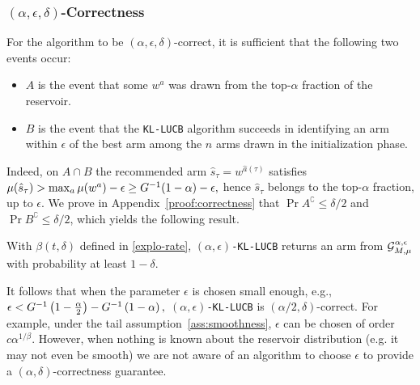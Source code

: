 %
%
\subsubsection{$(\alpha,\epsilon,\delta)$-Correctness}\label{sec-correctness}

For the algorithm to be $(\alpha,\epsilon,\delta)$-correct, it is sufficient that the following two events occur: 
\begin{itemize}[nosep]
    \item $A$ is the event that some $w^a$ was drawn from the
         top-$\alpha$ fraction of the reservoir.
    \item $B$ is the event that the \texttt{KL-LUCB} algorithm succeeds in 
identifying an arm within $\epsilon$ of the best arm among the $n$ arms drawn in the initialization
phase.
\end{itemize}
%
Indeed, on $A\cap B$ the recommended arm $\hat{s}_\tau = w^{\hat{a}(\tau)}$ satisfies 
$
\mu(\hat{s}_\tau)  >  \max_{a} \mu(w^a) - \epsilon  \geq  G^{-1}(1-\alpha) - \epsilon, 
$
hence $\hat{s}_\tau$ belongs to the top-$\alpha$ fraction, up to $\epsilon$. We prove in
Appendix~\ref{proof:correctness}
that $\Pr{A^\complement} \leq \delta/2$ and $\Pr{B^\complement}\leq \delta/2$,
which yields the following result. 
%
\vspace{-2pt}
%
\begin{lemma}\label{correctness}
With $\beta(t,\delta)$ defined in \eqref{explo-rate}, \texttt{$(\alpha,\epsilon)$-KL-LUCB} returns an arm from $\mathcal{G}_{M,\mu}^{\alpha,\epsilon}$
with probability at least $1-\delta$.
\end{lemma}
%
\vspace{-2pt}
%
It follows that when the parameter $\epsilon$ is chosen small
enough, e.g.,
$
\epsilon < G^{-1}\left(1 - \frac{\alpha}{2}\right) - G^{-1}\left(1 - {\alpha}\right),
$
\texttt{$(\alpha,\epsilon)$-KL-LUCB} is $(\alpha/2,\delta)$-correct.
For example, under the tail assumption~\ref{ass:smoothness}, $\epsilon$ can be 
chosen of order $c\alpha^{1/\beta}$.
However, when nothing is known about the reservoir distribution (e.g. it may
not even be smooth) we are not aware of an algorithm to choose $\epsilon$
to provide a $(\alpha,\delta)$-correctness guarantee.


